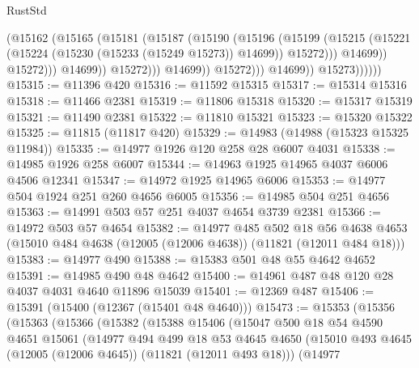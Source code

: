 \begin{lexlean}{RustStd}
\begin{coremodule}
                                      (@15162
                                        (@15165
                                          (@15181
                                            (@15187
                                              (@15190
                                                (@15196
                                                  (@15199
                                                    (@15215
                                                      (@15221
                                                        (@15224
                                                          (@15230 (@15233 (@15249 @15273)) @14699))
                                                        @15272)))
                                                  @14699))
                                              @15272)))
                                        @14699))
                                    @15272)))
                              @14699))
                          @15272)))
                    @14699))
                @15273))))))
@15315 := @11396 @420
@15316 := @11592 @15315
@15317 := @15314 @15316
@15318 := @11466 @2381
@15319 := @11806 @15318
@15320 := @15317 @15319
@15321 := @11490 @2381
@15322 := @11810 @15321
@15323 := @15320 @15322
@15325 := @11815 (@11817 @420)
@15329 := @14983 (@14988 (@15323 @15325 @11984))
@15335 := @14977 @1926 @120 @258 @28 @6007 @4031
@15338 := @14985 @1926 @258 @6007
@15344 := @14963 @1925 @14965 @4037 @6006 @4506 @12341
@15347 := @14972 @1925 @14965 @6006
@15353 := @14977 @504 @1924 @251 @260 @4656 @6005
@15356 := @14985 @504 @251 @4656
@15363 := @14991 @503 @57 @251 @4037 @4654 @3739 @2381
@15366 := @14972 @503 @57 @4654
@15382 := @14977
    @485
    @502
    @18
    @56
    @4638
    @4653
    (@15010 @484 @4638 (@12005 (@12006 @4638)) (@11821 (@12011 @484 @18)))
@15383 := @14977 @490
@15388 := @15383 @501 @48 @55 @4642 @4652
@15391 := @14985 @490 @48 @4642
@15400 := @14961 @487 @48 @120 @28 @4037 @4031 @4640 @11896 @15039
@15401 := @12369 @487
@15406 := @15391 (@15400 (@12367 (@15401 @48 @4640)))
@15473 := @15353
    (@15356
      (@15363
        (@15366
          (@15382
            (@15388
              @15406
              (@15047
                @500
                @18
                @54
                @4590
                @4651
                @15061
                (@14977
                  @494
                  @499
                  @18
                  @53
                  @4645
                  @4650
                  (@15010 @493 @4645 (@12005 (@12006 @4645)) (@11821 (@12011 @493 @18)))
                  (@14977

\end{coremodule}
\end{lexlean}
